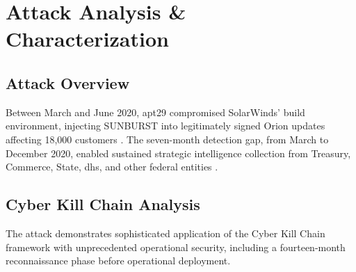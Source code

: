 \section{Attack Analysis \& Characterization}
\label{sec:attack_analysis}

\subsection{Attack Overview}
Between March and June 2020, \gls{apt}29 compromised SolarWinds' build environment, injecting SUNBURST into legitimately signed Orion updates affecting 18,000 customers \cite{fireeye2020, nagle2023}. The seven-month detection gap, from March to December 2020, enabled sustained strategic intelligence collection from Treasury, Commerce, State, \gls{dhs}, and other federal entities \cite{openhearing2021}.

\subsection{Cyber Kill Chain Analysis}
The attack demonstrates sophisticated application of the Cyber Kill Chain framework \cite{hutchins2011} with unprecedented operational security, including a fourteen-month reconnaissance phase before operational deployment.

